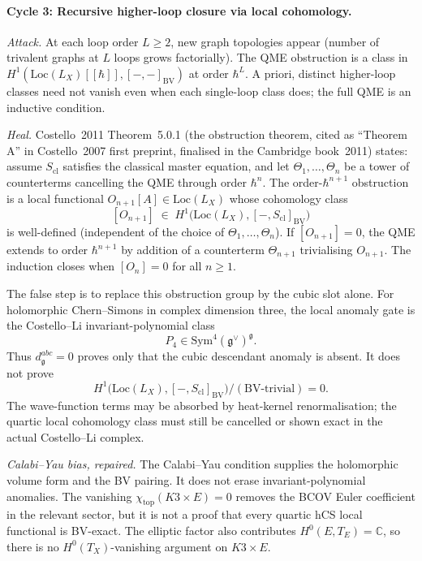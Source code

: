 \documentclass[11pt]{amsart}
\theoremstyle{definition}
\theoremstyle{remark}
\providecommand{\C}{\mathbb{C}}
\providecommand{\frakg}{\mathfrak{g}}
\providecommand{\Sym}{\mathrm{Sym}}
\providecommand{\Loc}{\mathrm{Loc}}
\providecommand{\BV}{\mathrm{BV}}
\begin{document}
\paragraph{Cycle 3: Recursive higher-loop closure via local cohomology.}
\emph{Attack.}
At each loop order $L \geq 2$, new graph topologies appear (number of
trivalent graphs at $L$ loops grows factorially). The QME obstruction
is a class in $H^1(\Loc(L_X)[[\hbar]], [-, -]_\BV)$ at order $\hbar^L$.
A priori, distinct higher-loop classes need not vanish even when each
single-loop class does; the full QME is an inductive condition.

\emph{Heal.}
Costello~2011 Theorem~5.0.1 (the obstruction theorem, cited as
``Theorem A'' in Costello~2007 first preprint, finalised in the
Cambridge book~2011) states: assume $S_{\mathrm{cl}}$ satisfies the
classical master equation, and let
$\Theta_1, \dots, \Theta_n$ be a tower of counterterms cancelling the
QME through order $\hbar^n$. The order-$\hbar^{n+1}$ obstruction is a
local functional $O_{n+1}[A] \in \Loc(L_X)$ whose cohomology class
\[
  [O_{n+1}] \;\in\;
  H^1\bigl(\Loc(L_X), [-, S_{\mathrm{cl}}]_\BV\bigr)
\]
is well-defined (independent of the choice of $\Theta_1, \dots,
\Theta_n$). If $[O_{n+1}] = 0$, the QME extends to order $\hbar^{n+1}$
by addition of a counterterm $\Theta_{n+1}$ trivialising
$O_{n+1}$. The induction closes when $[O_n] = 0$ for all $n \geq 1$.

The false step is to replace this obstruction group by the cubic slot
alone. For holomorphic Chern--Simons in complex dimension three, the
local anomaly gate is the Costello--Li invariant-polynomial class
\[
  P_4\in\Sym^4(\frakg^\vee)^\frakg .
\]
Thus $d^{abc}_\frakg=0$ proves only that the cubic descendant anomaly
is absent. It does not prove
\[
  H^1\bigl(\Loc(L_X),[-,S_{\mathrm{cl}}]_\BV\bigr)/(\text{BV-trivial})
  =0.
\]
The wave-function terms may be absorbed by heat-kernel
renormalisation; the quartic local cohomology class must still be
cancelled or shown exact in the actual Costello--Li complex.

\emph{Calabi--Yau bias, repaired.}
The Calabi--Yau condition supplies the holomorphic volume form and the
BV pairing. It does not erase invariant-polynomial anomalies. The
vanishing $\chi_{\mathrm{top}}(K3\times E)=0$ removes the BCOV Euler
coefficient in the relevant sector, but it is not a proof that every
quartic hCS local functional is BV-exact. The elliptic factor also
contributes $H^0(E,T_E)=\C$, so there is no $H^0(T_X)$-vanishing
argument on $K3\times E$.
\end{document}
